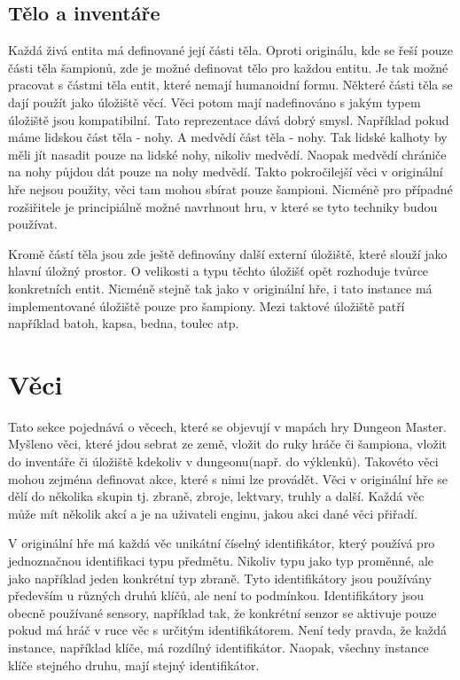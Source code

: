 \subsection{Tělo a inventáře}
Každá živá entita má definované její části těla. Oproti originálu, kde se řeší pouze části těla šampionů,
zde je možné definovat tělo pro každou entitu. Je tak možné pracovat s částmi těla entit, které nemají humanoidní formu.
Některé části těla se dají použít jako úložiště věcí. Věci potom mají nadefinováno s jakým typem úložiště jsou kompatibilní.
Tato reprezentace dává dobrý smysl. Například pokud máme lidskou část těla - nohy. A medvědí část těla - nohy. Tak lidské
kalhoty by měli jít nasadit pouze na lidské nohy, nikoliv medvědí. Naopak medvědí chrániče na nohy půjdou dát pouze na
nohy medvědí. Takto pokročilejší věci v originální hře nejsou použity, věci tam mohou sbírat pouze šampioni. Nicméně
pro případné rozšiřitele je principiálně možné navrhnout hru, v které se tyto techniky budou používat.

Kromě částí těla jsou zde ještě definovány další externí úložiště, které slouží jako hlavní úložný prostor. O velikosti
a typu těchto úložišť opět rozhoduje tvůrce konkretních entit. Nicméně stejně tak jako v originální hře, i tato instance má implementované 
úložiště pouze pro šampiony. Mezi taktové úložiště patří například batoh, kapsa, bedna, toulec atp.

\section{Věci}
Tato sekce pojednává o věcech, které se objevují v mapách hry Dungeon Master. Myšleno věci, které jdou sebrat ze země,
vložit do ruky hráče či šampiona, vložit do inventáře či úložiště kdekoliv v dungeonu(např. do výklenků). Takovéto věci 
mohou zejména definovat akce, které s nimi lze provádět. Věci v originální hře se dělí do několika skupin tj. zbraně,
zbroje, lektvary, truhly a další. Každá věc může mít několik akcí a je na uživateli enginu, jakou akci dané věci přiřadí.

V originální hře má každá věc unikátní číselný identifikátor, který používá pro jednoznačnou identifikaci typu předmětu.
Nikoliv typu jako typ proměnné, ale jako například jeden konkrétní typ zbraně. Tyto identifikátory jsou používány především
u různých druhů klíčů, ale není to podmínkou. Identifikátory jsou obecně používané sensory, například tak, že konkrétní senzor
se aktivuje pouze pokud má hráč v ruce věc s určitým identifikátorem. Není tedy pravda, že každá instance, například klíče, má
rozdílný identifikátor. Naopak, všechny instance klíče stejného druhu, mají stejný identifikátor.

